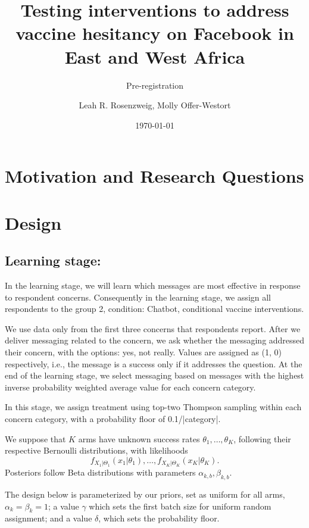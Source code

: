 \documentclass[letterpaper, 12pt, parskip=full,DIV=10]{scrartcl}
\title{Testing interventions to address vaccine hesitancy on Facebook in East and West Africa}
\subtitle{Pre-registration}
\author{Leah R. Rosenzweig, Molly Offer-Westort}
\date{\today}
\begin{document}
%
\normalsize%
\maketitle%
\tableofcontents%
\clearpage

\section{Motivation and Research Questions}


\section{Design}

\subsection{Learning stage:}
In the learning stage, we will learn which messages are most effective in response to respondent concerns.  Consequently in the learning stage, we assign all respondents to the group 2, condition: Chatbot, conditional vaccine interventions.

We use data only from the first three concerns that respondents report. After we deliver messaging related to the concern, we ask whether the messaging addressed their concern, with the options: yes, not really. Values are assigned as (1, 0) respectively, i.e., the message is a success only if it addresses the question. At the end of the learning stage, we select messaging based on messages with the highest inverse probability weighted average value for each concern category. 

In this stage, we assign treatment using top-two Thompson sampling \cite{russo16a} within each concern category, with a probability floor of 0.1/|category|.

We suppose that $K$ arms have unknown success rates $\theta_1, \dots, \theta_K$, following their respective Bernoulli distributions, with likelihoods
\[f_{X_1|\Theta_1}(x_1|\theta_1),\dots, f_{X_K|\Theta_K}(x_K|\theta_K).\]
Posteriors follow Beta distributions with parameters $\alpha_{k,b}, \beta_{k,b}$. 

The design below is parameterized by our priors, set as uniform for all arms, $\alpha_{k} = \beta_{k} =1$; a value $\gamma$ which sets the first batch size for uniform random assignment; and a value $\delta$, which sets the probability floor. 
\end{document}
